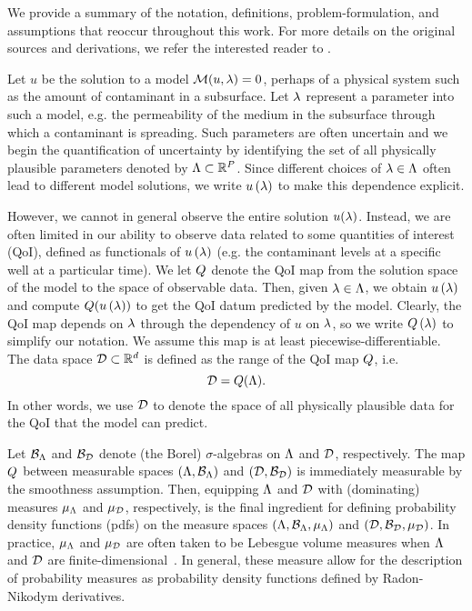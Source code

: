 We provide a summary of the notation, definitions, problem-formulation, and assumptions that reoccur throughout this work. 
For more details on the original sources and derivations,  we refer the interested reader to \cite{BES12, BE13, BET+14}. 

Let $u$ be the solution to a model $\mathcal{M}(u, \lambda) = 0$, perhaps of a physical system such as the amount of contaminant in a subsurface. 
Let $\lambda$ represent a parameter into such a model, e.g. the permeability of the medium in the subsurface through which a contaminant is spreading.
Such parameters are often uncertain and we begin the quantification of uncertainty by identifying the set of all physically plausible parameters denoted by ${\Lambda}\subset\mathbb{R}^P$.
Since different choices of $\lambda \in {\Lambda}$ often lead to different model solutions, we write $u\left ( \lambda \right )$ to make this dependence explicit.

However, we cannot in general observe the entire solution $u(\lambda)$.
Instead, we are often limited in our ability to observe data related to some quantities of interest (QoI), defined as functionals of $u\left ( \lambda \right )$ (e.g. the contaminant levels at a specific well at a particular time).
We let $Q$ denote the QoI map from the solution space of the model to the space of observable data. 
Then, given $\lambda \in {\Lambda}$, we obtain $u\left ( \lambda \right )$ and compute $Q(u\left ( \lambda \right ))$ to get the QoI datum predicted by the model.
Clearly, the QoI map depends on $\lambda$ through the dependency of $u$ on $\lambda$, so we write $Q\left ( \lambda \right )$ to simplify our notation.
We assume this map is at least piecewise-differentiable.	
The data space $\mathcal{D} \subset \mathbb{R}^d$ is defined as the range of the QoI map $Q$, i.e. 
\[
\mathcal{D} = Q({\Lambda}).
\]
In other words, we use $\mathcal{D}$ to denote the space of all physically plausible data for the QoI that the model can predict.


Let $\mathcal{B}_{{\Lambda}}$ and $\mathcal{B}_{\mathcal{D}}$ denote (the Borel) $\sigma$-algebras on ${\Lambda}$ and $\mathcal{D}$, respectively.
The map $Q$ between measurable spaces $({\Lambda}, \mathcal{B}_{{\Lambda}})$ and $(\mathcal{D}, \mathcal{B}_{\mathcal{D}})$ is immediately measurable by the smoothness assumption. 
Then, equipping ${\Lambda}$ and $\mathcal{D}$ with (dominating) measures $\mu_{{\Lambda}}$ and $\mu_{\mathcal{D}}$, respectively, is the final ingredient for defining probability density functions (pdfs) on the measure spaces $({\Lambda}, \mathcal{B}_{{\Lambda}}, \mu_{{\Lambda}})$ and $(\mathcal{D}, \mathcal{B}_{\mathcal{D}}, \mu_{\mathcal{D}})$.
In practice, $\mu_{{\Lambda}}$ and $\mu_{\mathcal{D}}$ are often taken to be Lebesgue volume measures when ${\Lambda}$ and $\mathcal{D}$ are finite-dimensional~\cite{BET+14, BJW18}.
In general, these measure allow for the description of probability measures as probability density functions defined by Radon-Nikodym derivatives.


